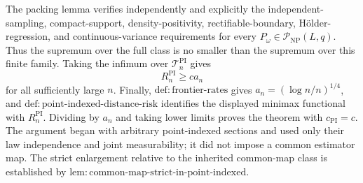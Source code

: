 The packing lemma verifies independently and explicitly the independent-sampling, compact-support, density-positivity, rectifiable-boundary, H\"older-regression, and continuous-variance requirements for every \(P_\omega\in\mathcal P_{\mathrm{NP}}(L,q)\).  Thus the supremum over the full class is no smaller than the supremum over this finite family.  Taking the infimum over \(\mathcal T_n^{\mathrm{PI}}\) gives
\[
 R_n^{\mathrm{PI}}\geq c a_n
\]
for all sufficiently large \(n\).  Finally, \(\mathrm{def:frontier\text{-}rates}\) gives \(a_n=(\log n/n)^{1/4}\), and \(\mathrm{def:point\text{-}indexed\text{-}distance\text{-}risk}\) identifies the displayed minimax functional with \(R_n^{\mathrm{PI}}\).  Dividing by \(a_n\) and taking lower limits proves the theorem with \(c_{\mathrm{PI}}=c\).  The argument began with arbitrary point-indexed sections and used only their law independence and joint measurability; it did not impose a common estimator map.  The strict enlargement relative to the inherited common-map class is established by \(\mathrm{lem:common\text{-}map\text{-}strict\text{-}in\text{-}point\text{-}indexed}\).